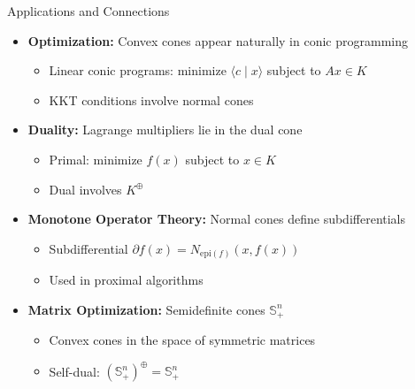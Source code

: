 \documentclass[aspectratio=169,10pt]{beamer}
\begin{document}
\begin{frame}[allowframebreaks]{Applications and Connections}
\begin{itemize}
    \item \textbf{Optimization:} Convex cones appear naturally in conic programming
    \begin{itemize}
        \item Linear conic programs: minimize $\langle c \mid x \rangle$ subject to $Ax \in K$
        \item KKT conditions involve normal cones
    \end{itemize}

    \item \textbf{Duality:} Lagrange multipliers lie in the dual cone
    \begin{itemize}
        \item Primal: minimize $f(x)$ subject to $x \in K$
        \item Dual involves $K^{\oplus}$
    \end{itemize}

    \item \textbf{Monotone Operator Theory:} Normal cones define subdifferentials
    \begin{itemize}
        \item Subdifferential $\partial f(x) = N_{\text{epi}(f)}(x, f(x))$
        \item Used in proximal algorithms
    \end{itemize}

    \item \textbf{Matrix Optimization:} Semidefinite cones $\mathbb{S}^n_+$
    \begin{itemize}
        \item Convex cones in the space of symmetric matrices
        \item Self-dual: $(\mathbb{S}^n_+)^{\oplus} = \mathbb{S}^n_+$
    \end{itemize}
\end{itemize}
\end{frame}
\end{document}
